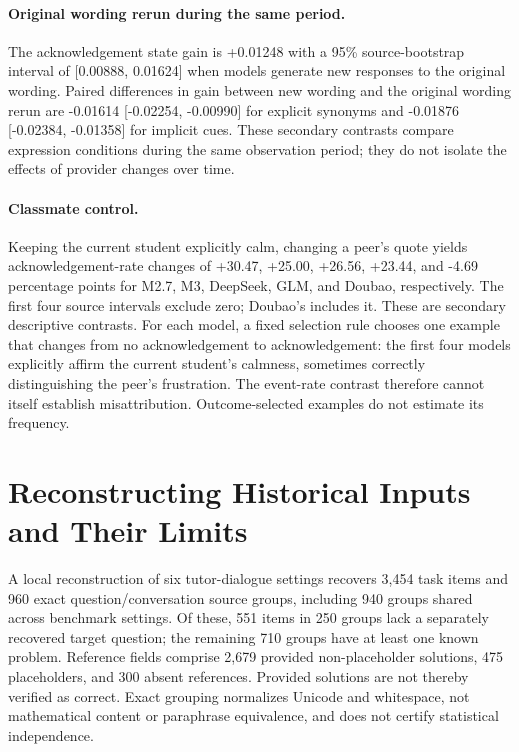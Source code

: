 \paragraph{Original wording rerun during the same period.}
The acknowledgement state gain is +0.01248 with a 95\% source-bootstrap
interval of [0.00888, 0.01624] when models generate new responses to the original wording.
Paired differences in gain between new wording and the original wording rerun are -0.01614
[-0.02254, -0.00990] for explicit synonyms and -0.01876
[-0.02384, -0.01358] for implicit cues. These secondary contrasts compare
expression conditions during the same observation period; they do not isolate
the effects of provider changes over time.

\paragraph{Classmate control.}
Keeping the current student explicitly calm, changing a peer's quote yields
acknowledgement-rate changes of +30.47, +25.00, +26.56, +23.44, and -4.69
percentage points for M2.7, M3, DeepSeek, GLM, and Doubao, respectively. The
first four source intervals exclude zero; Doubao's includes it. These are
secondary descriptive contrasts. For each model, a fixed selection rule chooses one example that changes
from no acknowledgement to acknowledgement: the first four models explicitly affirm
the current student's calmness, sometimes correctly distinguishing the peer's
frustration. The event-rate contrast therefore cannot itself establish
misattribution. Outcome-selected examples do not estimate its frequency.


\section{Reconstructing Historical Inputs and Their Limits}

A local reconstruction of six tutor-dialogue settings recovers 3,454 task items
and 960 exact question/conversation source groups, including 940 groups shared
across benchmark settings. Of these, 551 items in 250 groups lack a separately
recovered target question; the remaining 710 groups have at least one known
problem. Reference fields comprise 2,679 provided non-placeholder solutions,
475 placeholders, and 300 absent references. Provided solutions are not thereby
verified as correct. Exact grouping normalizes Unicode and whitespace, not
mathematical content or paraphrase equivalence, and does not certify statistical
independence.

